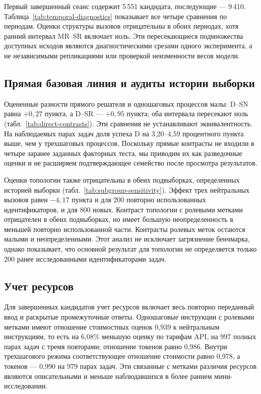 Первый завершенный сеанс содержит 5\,551 кандидата, последующие --- 9\,410. Таблица~\ref{tab:temporal-diagnostics} показывает все четыре сравнения по периодам. Оценки структуры вызовов отрицательны в обоих периодах, хотя ранний интервал MR--SR включает ноль. Эти пересекающиеся подмножества доступных исходов являются диагностическими срезами одного эксперимента, а не независимыми репликациями или проверкой неизменности весов модели.



\subsection{Прямая базовая линия и аудиты истории выборки}
Оцененные разности прямого решателя и одношаговых процессов малы: D--SN равна $+0{,}27$ пункта, а D--SR --- $+0{,}95$ пункта; оба интервала пересекают ноль (табл.~\ref{tab:direct-contrasts}). Эти сравнения не устанавливают эквивалентность. На наблюдаемых парах задач доля успеха D на 3,20--4,59 процентного пункта выше, чем у трехшаговых процессов. Поскольку прямые контрасты не входили в четыре заранее заданных факторных теста, мы приводим их как разведочные оценки и не расширяем подтверждающее семейство после просмотра результатов.



Оценки топологии также отрицательны в обеих подвыборках, определенных историей выборки (табл.~\ref{tab:subgroup-sensitivity}). Эффект трех нейтральных вызовов равен $-4{,}17$ пункта и для 200 повторно использованных идентификаторов, и для 800 новых. Контраст топологии с ролевыми метками отрицателен в обеих подвыборках, но имеет большую неопределенность в меньшей повторно использованной части. Контрасты ролевых меток остаются малыми и неопределенными. Этот анализ не исключает загрязнение бенчмарка, однако показывает, что основной результат для топологии не определяется только 200 ранее исследованными идентификаторами задач.



\subsection{Учет ресурсов}
Для завершенных кандидатов учет ресурсов включает весь повторно переданный ввод и раскрытые промежуточные ответы. Одношаговые инструкции с ролевыми метками имеют отношение стоимостных оценок 0,939 к нейтральным инструкциям, то есть на 6,08\% меньшую оценку по тарифам API, на 997 полных парах задач с тремя повторами; отношение токенов равно 0,986. Внутри трехшагового режима соответствующее отношение стоимости равно 0,978, а токенов --- 0,990 на 979 парах задач. Эти связанные с метками различия ресурсов являются описательными и меньше наблюдавшихся в более раннем мини-исследовании.

